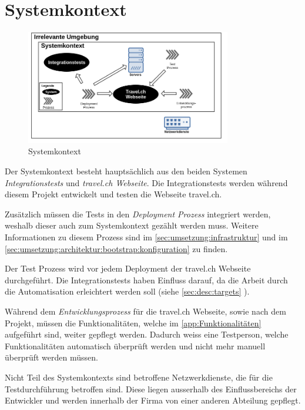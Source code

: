 \section{Systemkontext}
\begin{figure}[H]
	\centering
	\includegraphics[width=0.8\textwidth]{images/Semesterarbeit Systemkontext.png}
	\caption{Systemkontext}
	\label{fig:analyse:systemkontext}
\end{figure}
Der Systemkontext besteht hauptsächlich aus den beiden Systemen \textit{Integrationstests} und \textit{travel.ch Webseite}. Die Integrationstests werden während diesem Projekt entwickelt und testen die Webseite travel.ch.

Zusätzlich müssen die Tests in den \textit{Deployment Prozess} integriert werden, weshalb dieser auch zum Systemkontext gezählt werden muss. Weitere Informationen zu diesem Prozess sind im \cref{sec:umsetzung:infrastruktur}  und im \cref{sec:umsetzung:architektur:bootstrap:konfiguration}  zu finden.

Der Test Prozess wird vor jedem Deployment der travel.ch Webseite durchgeführt. Die Integrationstests haben Einfluss darauf, da die Arbeit durch die Automatisation erleichtert werden soll (siehe \cref{sec:desc:targets} ).

Während dem \textit{Entwicklungsprozess} für die travel.ch Webseite, sowie nach dem Projekt, müssen die Funktionalitäten, welche im \cref{app:Funktionalitäten}  aufgeführt sind, weiter gepflegt werden. Dadurch weiss eine Testperson, welche Funktionalitäten automatisch überprüft werden und nicht mehr manuell überprüft werden müssen.

Nicht Teil des Systemkontexts sind betroffene Netzwerkdienste, die für die Testdurchführung betroffen sind. Diese liegen ausserhalb des Einflussbereichs der Entwickler und werden innerhalb der Firma von einer anderen Abteilung gepflegt.

